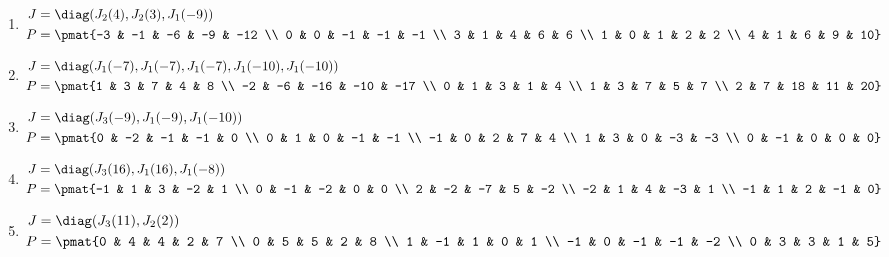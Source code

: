 \begin{enumerate}
\item

\begin{align*}
J &= \diag(J_{2}(4), J_{2}(3), J_{1}(-9))\\
P &= \pmat{-3 & -1 & -6 & -9 & -12 \\ 0 & 0 & -1 & -1 & -1 \\ 3 & 1 & 4 & 6 & 6 \\ 1 & 0 & 1 & 2 & 2 \\ 4 & 1 & 6 & 9 & 10}
\end{align*}

\item

\begin{align*}
J &= \diag(J_{1}(-7), J_{1}(-7), J_{1}(-7), J_{1}(-10), J_{1}(-10))\\
P &= \pmat{1 & 3 & 7 & 4 & 8 \\ -2 & -6 & -16 & -10 & -17 \\ 0 & 1 & 3 & 1 & 4 \\ 1 & 3 & 7 & 5 & 7 \\ 2 & 7 & 18 & 11 & 20}
\end{align*}

\item

\begin{align*}
J &= \diag(J_{3}(-9), J_{1}(-9), J_{1}(-10))\\
P &= \pmat{0 & -2 & -1 & -1 & 0 \\ 0 & 1 & 0 & -1 & -1 \\ -1 & 0 & 2 & 7 & 4 \\ 1 & 3 & 0 & -3 & -3 \\ 0 & -1 & 0 & 0 & 0}
\end{align*}

\item

\begin{align*}
J &= \diag(J_{3}(16), J_{1}(16), J_{1}(-8))\\
P &= \pmat{-1 & 1 & 3 & -2 & 1 \\ 0 & -1 & -2 & 0 & 0 \\ 2 & -2 & -7 & 5 & -2 \\ -2 & 1 & 4 & -3 & 1 \\ -1 & 1 & 2 & -1 & 0}
\end{align*}

\item

\begin{align*}
J &= \diag(J_{3}(11), J_{2}(2))\\
P &= \pmat{0 & 4 & 4 & 2 & 7 \\ 0 & 5 & 5 & 2 & 8 \\ 1 & -1 & 1 & 0 & 1 \\ -1 & 0 & -1 & -1 & -2 \\ 0 & 3 & 3 & 1 & 5}
\end{align*}


\end{enumerate}
